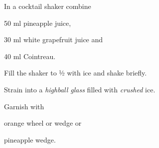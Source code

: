 \startsection[title={Sunkiss},reference=sunkiss]
\startitemize
\item In a cocktail shaker combine
      \startitemize
      \item 50 ml pineapple juice,
      \item 30 ml white grapefruit juice and
      \item 40 ml Cointreau.
      \stopitemize
\item Fill the shaker to ½ with ice and shake briefly.
\item Strain into a {\em highball glass} filled with {\em crushed} ice.
\item Garnish with
      \startitemize
      \item orange wheel or wedge or
      \item pineapple wedge.
      \stopitemize
\stopitemize

